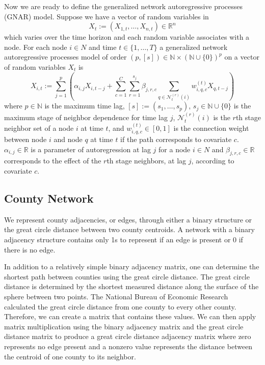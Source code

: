 Now we are ready to define the generalized network autoregressive processes (GNAR) model.  Suppose we have a vector of random variables in 
\[
X_t := (X_{1, t}, \ldots , X_{n, t}) \in \mathbb{R}^n
\]
which varies over the time horizon and each random variable associates with a node.
For each node $i \in N$ and time $t \in \{1, \ldots , T\}$ a generalized network autoregressive processes model of order $(p, [s]) \in \mathbb{N} \times (\mathbb{N}\cup \{0\})^p$ on a vector of random variables $X_t$ is
\[
X_{i, t}:= \sum_{j = 1}^p \left(\alpha_{i, j}X_{i, t-j} + \sum_{c = 1}^C\sum_{r = 1}^{s_j}\beta_{j, r, c} \sum_{q \in \mathcal{N}_t^{(r)}(i)} w_{i, q, c}^{(t)}X_{q, t-j}\right)
\]
where $p \in \mathbb{N}$ is the maximum time lag, $[s]:= (s_1, \ldots , s_p)$, $s_j \in \mathbb{N} \cup \{0\}$ is the maximum stage of neighbor dependence for time lag $j$, $\mathcal{N}_t^{(r)}(i)$ is the $r$th stage neighbor set of a node $i$ at time $t$, and  $w_{i, q, c}^{(t)} \in [0, 1]$ is the connection weight between node $i$ and node $q$ at time $t$ if the path corresponds to covariate $c$. $\alpha_{i, j} \in \mathbb{R}$ is a parameter of autoregression at lag $j$ for a node $i \in N$ and $\beta_{j, r, c} \in \mathbb{R}$ corresponds to the effect of the $r$th stage neighbors, at lag $j$,
according to covariate $c$.

\subsection{County Network}

We represent county adjacencies, or edges, through either a binary structure or the great circle distance between two county centroids.  A network with a binary adjacency structure contains only 1s to represent if an edge is present or 0 if there is no edge.  

In addition to a relatively simple binary adjacency matrix, one can determine the shortest path between counties using the great circle distance.  The great circle distance is determined by the shortest measured distance along the surface of the sphere between two points.  The National Bureau of Economic Research calculated the great circle distance from one county to every other county.  Therefore, we can create a matrix that contains these values.  We can then apply matrix multiplication using the binary adjacency matrix and the great circle distance matrix to produce a great circle distance adjacency matrix where zero represents no edge present and a nonzero value represents the distance between the centroid of one county to its neighbor. 


